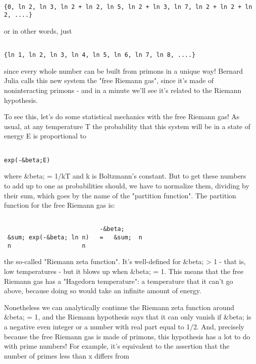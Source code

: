 \begin{verbatim}

{0, ln 2, ln 3, ln 2 + ln 2, ln 5, ln 2 + ln 3, ln 7, ln 2 + ln 2 + ln 2, ....}
\end{verbatim}
    
or in other words, just


\begin{verbatim}

{ln 1, ln 2, ln 3, ln 4, ln 5, ln 6, ln 7, ln 8, ....}
\end{verbatim}
    
since every whole number can be built from primons in a unique way!
Bernard Julia calls this new system the "free Riemann gas", since it's made
of noninteracting primons - and in a minute we'll see it's related to the 
Riemann hypothesis.

To see this, let's do some statistical mechanics with the free Riemann gas!  
As usual, at any temperature T the probability that this system will be in a 
state of energy E is proportional to


\begin{verbatim}

exp(-&beta;E)
\end{verbatim}
    
where &beta; = 1/kT and k is Boltzmann's constant.  But to get these
numbers to add up to one as probabilities should, we have to normalize
them, dividing by their sum, which goes by the name of the "partition
function".  The partition function for the free Riemann gas is:


\begin{verbatim}

                           -&beta;
 &sum; exp(-&beta; ln n)   =   &sum;  n
 n                    n
\end{verbatim}
    

the so-called "Riemann zeta function".  It's well-defined for &beta; > 1 -
that is, low temperatures - but it blows up when &beta; = 1.  This means that 
the free Riemann gas has a "Hagedorn temperature": a temperature that it 
can't go above, because doing so would take an infinite amount of energy.  

Nonetheless we can analytically continue the Riemann zeta function
around &beta; = 1, and the Riemann hypothesis says that it can only
vanish if &beta; is a negative even integer or a number with real part
equal to 1/2.  And, precisely because the free Riemann gas is made of
primons, this hypothesis has a lot to do with prime numbers!  For
example, it's equivalent to the assertion that the number of primes
less than x differs from


